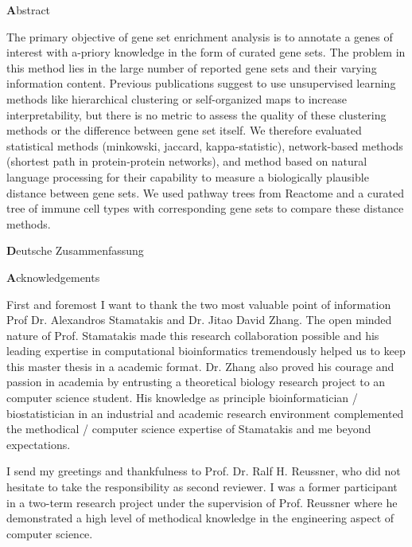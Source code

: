 \documentclass{thesisclass}
\begin{document}
\begin{addmargin}{0.5cm}

\centerline{\textbf Abstract}

The primary objective of gene set enrichment analysis is to annotate a genes of interest with a-priory knowledge in the form of curated gene sets. The problem in this method lies in the large number of reported gene sets and their varying information content. Previous publications suggest to use unsupervised learning methods like hierarchical clustering or self-organized maps to increase interpretability, but there is no metric to assess the quality of these clustering methods or the difference between gene set itself. We therefore evaluated statistical methods (minkowski, jaccard, kappa-statistic), network-based methods (shortest path in protein-protein networks), and method based on natural language processing for their capability to measure a biologically plausible distance between gene sets. We used pathway trees from Reactome and a curated tree of immune cell types with corresponding gene sets to compare these distance methods.  

\vskip 2cm

\centerline{\textbf Deutsche Zusammenfassung}



\vskip 2cm

\newpage

\centerline{\textbf Acknowledgements}

First and foremost I want to thank the two most valuable point of information Prof Dr. Alexandros Stamatakis and Dr. Jitao David Zhang. The open minded nature of Prof. Stamatakis made this research collaboration possible and his leading expertise in computational bioinformatics tremendously helped us to keep this master thesis in a academic format. Dr. Zhang also proved his courage and passion in academia by entrusting a theoretical biology research project to an computer science student. His knowledge as principle bioinformatician / biostatistician in an industrial and academic research environment complemented the methodical / computer science expertise of Stamatakis and me beyond expectations.

I send my greetings and thankfulness to Prof. Dr. Ralf H. Reussner, who did not hesitate to take the responsibility as second reviewer. I was a former participant in a two-term research project under the supervision of Prof. Reussner where he demonstrated a high level of methodical knowledge in the engineering aspect of computer science. 


\end{addmargin}
\end{document}
